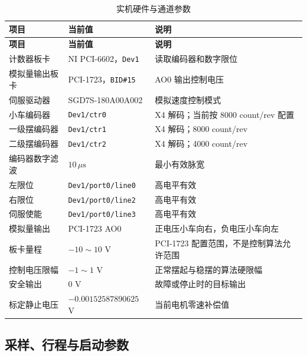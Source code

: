 \documentclass[12pt,a4paper]{article}
\begin{document}
\begin{longtable}{@{}p{4.2cm} p{4.4cm} p{6.0cm}@{}}
    \caption{实机硬件与通道参数}\label{tab:hardwareparams}\\
    \toprule
    \textbf{项目} & \textbf{当前值} & \textbf{说明} \\
    \midrule
    \endfirsthead
    \toprule
    \textbf{项目} & \textbf{当前值} & \textbf{说明} \\
    \midrule
    \endhead
    \bottomrule
    \endlastfoot
    计数器板卡 & NI PCI-6602，\texttt{Dev1} & 读取编码器和数字限位 \\
    模拟量输出板卡 & PCI-1723，\texttt{BID\#15} & AO0 输出控制电压 \\
    伺服驱动器 & SGD7S-180A00A002 & 模拟速度控制模式 \\
    小车编码器 & \texttt{Dev1/ctr0} & X4 解码；当前按 8000 count/rev 配置 \\
    一级摆编码器 & \texttt{Dev1/ctr1} & X4 解码；8000 count/rev \\
    二级摆编码器 & \texttt{Dev1/ctr2} & X4 解码；4000 count/rev \\
    编码器数字滤波 & $10\,\mu\text{s}$ & 最小有效脉宽 \\
    左限位 & \texttt{Dev1/port0/line0} & 高电平有效 \\
    右限位 & \texttt{Dev1/port0/line2} & 高电平有效 \\
    伺服使能 & \texttt{Dev1/port0/line3} & 高电平有效 \\
    模拟量输出 & PCI-1723 AO0 & 正电压小车向右，负电压小车向左 \\
    板卡量程 & $-10\sim 10$ V & PCI-1723 配置范围，不是控制算法允许范围 \\
    控制电压限幅 & $-1\sim 1$ V & 正常摆起与稳摆的算法硬限幅 \\
    安全输出 & 0 V & 故障或停止时的目标输出 \\
    标定静止电压 & $-0.00152587890625$ V & 当前电机零速补偿值 \\
\end{longtable}

\subsection{采样、行程与启动参数}
\end{document}
